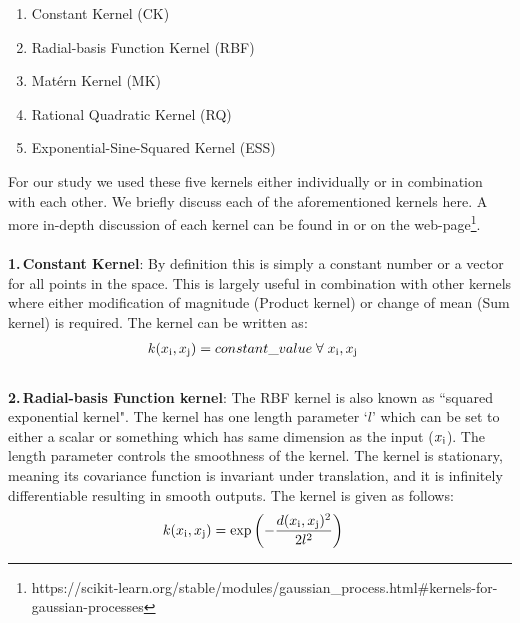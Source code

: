         \begin{enumerate}
            \item Constant Kernel (CK)
            \item Radial-basis Function Kernel (RBF)
            \item Mat\'ern Kernel (MK)
            \item Rational Quadratic Kernel (RQ)
            \item Exponential-Sine-Squared Kernel (ESS)
        \end{enumerate}
        For our study we used these five kernels either individually or in combination with each
        other. We briefly discuss each of the aforementioned kernels here. A more in-depth
        discussion of each kernel can be found in \citet{Rasmussen2006} or on the
        web-page\footnote{https://scikit-learn.org/stable/modules/gaussian\_process.html\#kernels-for-gaussian-processes}.\\
        \\
        \textbf{1.\,Constant Kernel}: By definition this is simply a constant number or a vector for
        all points in the space. This is largely useful in combination with other kernels where
        either modification of magnitude (Product kernel) or change of mean (Sum kernel) is
        required. The kernel can be written as:
        \begin{align}
            \begin{split}
                k(x_{\rm i},x_{\rm j}) & = constant\_value \;\forall\; x_{\rm i}, x_{\rm j} \label{eq:cst_ker}
            \end{split}
        \end{align}
        \\
        \textbf{2.\,Radial-basis Function kernel}: The RBF kernel is also known as ``squared
        exponential kernel". The kernel has one length parameter `$l$' which can be set to either a
        scalar or something which has same dimension as the input ($x_{\rm i}$). The length
        parameter controls the smoothness of the kernel. The kernel is stationary, meaning its
        covariance function is invariant under translation, and it is infinitely differentiable
        resulting in smooth outputs. The kernel is given as follows:
        \begin{align}
            \begin{split}
                k(x_{\rm i}, x_{\rm j}) & = \exp\left(- \frac{d(x_{\rm i}, x_{\rm j})^2}{2l^2} \right) \label{eq:rbf_ker}
            \end{split}
        \end{align}

